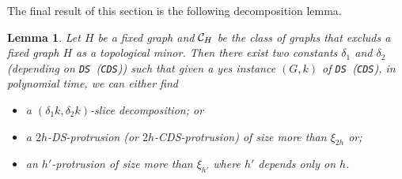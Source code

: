 \documentclass[11pt]{article}
\newtheorem{lemma}{Lemma}
\newcommand{\tDS}{{\texttt{\sc DS}}}
\newcommand{\tCDS}{{\texttt{\sc CDS}}}
\begin{document}
The final result of this section is the following decomposition lemma. 



\begin{lemma}
\label{lem:slicedeco}
Let $H$ be a fixed graph and ${\cal C}_H$ be the class of graphs that excluds a fixed graph $H$ as a topological minor.  
Then there exist two constants $\delta_1$ and $\delta_2$ (depending on \tDS \, (\tCDS)) 
such that given a yes instance $(G,k)$ of \tDS \, (\tCDS), in polynomial time,  we can either find 
\begin{itemize}
\item a $(\delta_1k,\delta_2 k)$-slice decomposition; or 
\item a $2h$-{\sc DS}-protrusion (or $2h$-{\sc CDS}-protrusion) of size more than $\xi_{2h}$ or;
\item an $h'$-protrusion of size more than $\xi_{h'}$ where $h'$ depends only on $h$.
\end{itemize}
\end{lemma}
\end{document}
